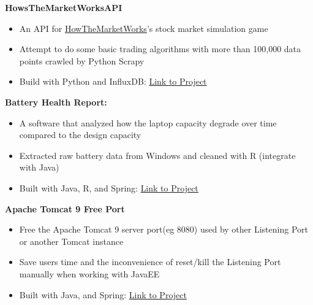 \documentclass[a4paper,11pt]{article}
\begin{document}
\begin{flushleft}
	
  \textbf{HowsTheMarketWorksAPI}
  \vspace{-\topsep}
  \begin{itemize}
  	\setlength{\parskip}{0pt}
  	\setlength{\itemsep}{0pt plus 1pt}
  	\item An API for \href{https://www.howthemarketworks.com/}{HowTheMarketWorks}'s stock market simulation game 
  	\item Attempt to do some basic trading algorithms with more than 100,000 data points crawled by Python Scrapy \item Build with Python and InfluxDB: \href{https://github.com/justinphan3110/HowTheMarketWorksAPI}{Link to Project}
  \end{itemize}	
	
 \textbf{Battery Health Report:} 
 \vspace{-\topsep}
 \begin{itemize}
 	\setlength{\parskip}{0pt}
 	\setlength{\itemsep}{0pt plus 1pt}
 	\item A software that analyzed how the laptop capacity degrade over time compared to the design capacity 
 	\item Extracted raw battery data from Windows and cleaned with R (integrate with Java)
 	\item Built with Java, R, and Spring: \href{https://github.com/justinphan3110/Battery-Health-Report}{Link to Project}
 \end{itemize}

  \textbf{Apache Tomcat 9 Free Port} 
  \vspace{-\topsep}
  \begin{itemize}
  	\setlength{\parskip}{0pt}
  	\setlength{\itemsep}{0pt plus 1pt}
  	\item Free the Apache Tomcat 9 server port(eg 8080) used by other Listening Port or another Tomcat instance
  	\item Save users time and the inconvenience of reset/kill the Listening Port manually when working with JavaEE
  	\item Built with Java, and Spring: \href{https://github.com/justinphan3110/Apache-Tomcat-9-Free-Port}{Link to Project}
  \end{itemize}
\end{flushleft}
\end{document}
